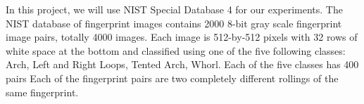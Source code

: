 
In this project, we will use NIST Special Database 4 \cite{nist-db-4} for our experiments.
%
The NIST database of fingerprint images contains 2000 8-bit gray scale fingerprint image pairs, totally 4000 images.
%
Each image is 512-by-512 pixels with 32 rows of white space at the bottom and classified using one of the five following classes: Arch, Left and Right Loops, Tented Arch, Whorl.
%
Each of the five classes has 400 pairs  Each of the fingerprint pairs are two completely different rollings of the same fingerprint.